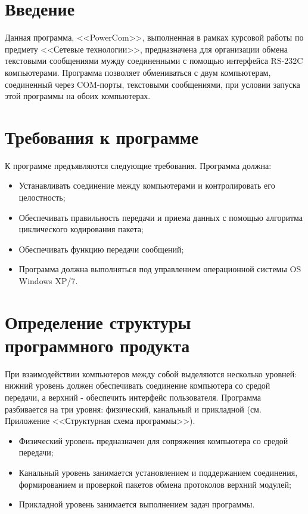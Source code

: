 \documentclass[russian,utf8,simple,emptystyle]{eskdtext}
\begin{document}
\maketitle
\tableofcontents
\newpage
\section{Введение}

Данная программа, <<PowerCom>>, выполненная в рамках курсовой работы по предмету <<Сетевые технологии>>, предназначена для организации обмена текстовыми сообщениями мужду соединенными с помощью интерфейса RS-232C компьютерами. Программа позволяет обмениваться с двум компьютерам, соединенный через COM-порты, текстовыми сообщениями, при условии запуска этой программы на обоих компьютерах.

\section{Требования к программе}
К программе предъявляются следующие требования. Программа должна:
\begin{itemize}
\item Устанавливать соединение между компьютерами и контролировать его целостность;
\item Обеспечивать правильность передачи и приема данных с помощью алгоритма циклического кодирования пакета;
\item Обеспечивать функцию передачи сообщений;
\item Программа должна выполняться под управлением операционной системы OS Windows XP/7.
\end{itemize}

\section{Определение структуры программного продукта}
При взаимодействии компьютеров между собой выделяются несколько уровней: нижний уровень должен обеспечивать соединение компьютера со средой передачи, а верхний - обеспечить интерфейс пользователя. Программа разбивается на три уровня: физический, канальный и прикладной (см. Приложение <<Структурная схема программы>>).
\begin{itemize}
\item Физический уровень предназначен для сопряжения компьютера со средой передачи;
\item Канальный уровень занимается установлением и поддержанием соединения, формированием и проверкой пакетов обмена протоколов верхний модулей;
\item Прикладной уровень занимается выполнением задач программы.
\end{itemize}
\end{document}
